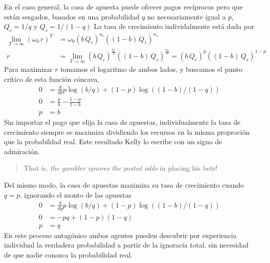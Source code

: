 \documentclass[a4paper,10pt]{book}
\theoremstyle{definition}
\begin{document}
En el caso general, la casa de apuesta puede ofrecer pagos recíprocos pero que están sesgados, basados en una probabilidad $q$ no necesariamente igual a $p$, $Q_c = 1/q$ y $Q_s = 1/(1-q)$
%
La tasa de crecimiento individalmente está dada por
%
\begin{equation}
\begin{split}
\lim_{T \rightarrow \infty } (\omega_0 \, r)^T &= \omega_0 (b \, Q_c)^{n_c} ((1-b) \, Q_s )^{n_s} \\
r &= \lim_{T \rightarrow \infty } (b \, Q_c)^{\frac{n_c}{T}} ((1-b) \, Q_s )^{\frac{n_s}{T}} = (b \, Q_c)^{p} ((1-b) \, Q_s )^{1-p}
\end{split}
\end{equation}
%
Para maximizar $r$ tomamos el logaritmo de ambos lados, y buscamos el punto crítico de esta función cóncava,
%
\begin{equation}
\begin{split}
0 &= \frac{d}{db} p \log (b/q) + (1-p) \log ((1-b)/(1-q)) \\
0 &= \frac{p}{b} - \frac{1-p}{1-b} \\
p &= b 
\end{split}
\end{equation}
%
Sin importar el pago que elija la casa de apuestas, individualmente la tasa de crecimiento siempre se maximiza dividiendo los recursos en la misma proproción que la probabildad real.
%
Este resultado Kelly lo escribe con un signo de admiración.
%
\begin{quotation}
That is, \emph{the gambler ignores the posted odds} in placing his bets!
\end{quotation}
%
Del mismo modo, la casa de apuestas maximiza su tasa de crecimiento cuando $q=p$, ignorando el monto de las apuestas
%
\begin{equation}
\begin{split}
0 &= \frac{d}{dq} p \log (b/q) + (1-p) \log ((1-b)/(1-q)) \\
0 &= - pq + (1-p)(1-q) \\
p &= q 
\end{split}
\end{equation}
%
En este proceso antagónico ambos agentes pueden descubrir por experiencia individual la verdadera probabilidad a partir de la ignoracia total, sin necesidad de que nadie conozca la probabilidad real.


\end{document}
